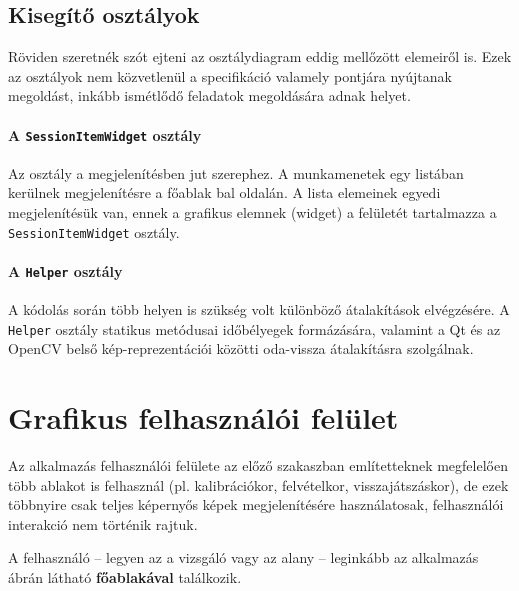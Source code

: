 \subsection{Kisegítő osztályok}\label{sect:helper}

Röviden szeretnék szót ejteni az osztálydiagram eddig mellőzött elemeiről is. Ezek az osztályok nem közvetlenül a specifikáció valamely pontjára nyújtanak megoldást, inkább ismétlődő feladatok megoldására adnak helyet.

\paragraph{A \texttt{SessionItemWidget} osztály}

Az osztály a megjelenítésben jut szerephez. A munkamenetek egy listában kerülnek megjelenítésre a főablak bal oldalán. A lista elemeinek egyedi megjelenítésük van, ennek a grafikus elemnek (widget) a felületét tartalmazza a \texttt{SessionItemWidget} osztály.

\paragraph{A \texttt{Helper} osztály}

A kódolás során több helyen is szükség volt különböző átalakítások elvégzésére. A \texttt{Helper} osztály statikus metódusai időbélyegek formázására, valamint a Qt és az OpenCV belső kép-reprezentációi közötti oda-vissza átalakításra szolgálnak.

\section{Grafikus felhasználói felület}\label{sect:gui}

Az alkalmazás felhasználói felülete az előző szakaszban említetteknek megfelelően több ablakot is felhasznál (pl. kalibrációkor, felvételkor, visszajátszáskor), de ezek többnyire csak teljes képernyős képek megjelenítésére használatosak, felhasználói interakció nem történik rajtuk.

A felhasználó -- legyen az a vizsgáló vagy az alany -- leginkább az alkalmazás  ábrán látható \textbf{főablakával} találkozik.

